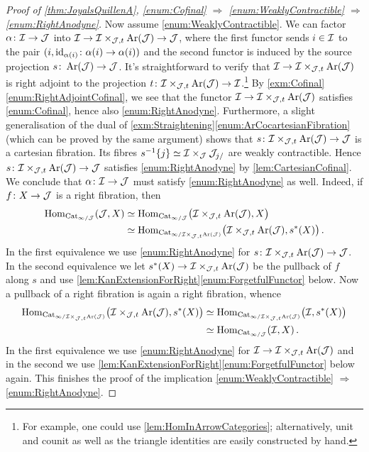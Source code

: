 \begin{proof}[Proof of \cref{thm:JoyalsQuillenA}, \cref{enum:Cofinal}  $\Rightarrow$ \cref{enum:WeaklyContractible} $\Rightarrow$ \cref{enum:RightAnodyne}]
	Now assume \cref{enum:WeaklyContractible}. We can factor $\alpha\colon \mathcal{I}\rightarrow \mathcal{J}$ into $\mathcal{I}\rightarrow \mathcal{I}\times_{\mathcal{J},t}\operatorname{Ar}(\mathcal{J})\rightarrow \mathcal{J}$, where the first functor sends $i\in \mathcal{I}$ to the pair $(i,\operatorname{id}_{\alpha(i)}\colon \alpha(i)\rightarrow \alpha(i))$ and the second functor is induced by the source projection $s\colon \operatorname{Ar}(\mathcal{J})\rightarrow \mathcal{J}$. It's straightforward to verify that $\mathcal{I}\rightarrow \mathcal{I}\times_{\mathcal{J},t}\operatorname{Ar}(\mathcal{J})$ is right adjoint to the projection $t\colon \mathcal{I}\times_{\mathcal{J},t}\operatorname{Ar}(\mathcal{J})\rightarrow \mathcal{I}$.\footnote{For example, one could use \cref{lem:HomInArrowCategories}; alternatively, unit and counit as well as the triangle identities are easily constructed by hand.} By \cref{exm:Cofinal}\cref{enum:RightAdjointCofinal}, we see that the functor $\mathcal{I}\rightarrow \mathcal{I}\times_{\mathcal{J},t}\operatorname{Ar}(\mathcal{J})$ satisfies \cref{enum:Cofinal}, hence also \cref{enum:RightAnodyne}. Furthermore, a slight generalisation of the dual of \cref{exm:Straightening}\cref{enum:ArCocartesianFibration} (which can be proved by the same argument) shows that $s\colon\mathcal{I}\times_{\mathcal{J},t}\operatorname{Ar}(\mathcal{J})\rightarrow \mathcal{J}$ is a cartesian fibration. Its fibres $s^{-1}\{j\}\simeq \mathcal{I}\times_{\mathcal{J}} \mathcal{J}_{j/}$ are weakly contractible. Hence $s\colon\mathcal{I}\times_{\mathcal{J},t}\operatorname{Ar}(\mathcal{J})\rightarrow \mathcal{J}$ satisfies \cref{enum:RightAnodyne} by \cref{lem:CartesianCofinal}. We conclude that $\alpha\colon \mathcal{I}\rightarrow \mathcal{J}$ must satisfy \cref{enum:RightAnodyne} as well. Indeed, if $f\colon X\rightarrow \mathcal{J}$ is a right fibration, then
	\begin{align*}
		\operatorname{Hom}_{\mathrm{Cat}_{\infty/\mathcal{J}}}(\mathcal{J},X)&\simeq \operatorname{Hom}_{\mathrm{Cat}_{\infty/\mathcal{J}}}\bigl(\mathcal{I}\times_{\mathcal{J},t}\operatorname{Ar}(\mathcal{J}),X\bigr)\\
		&\simeq  \operatorname{Hom}_{\mathrm{Cat}_{\infty/\mathcal{I}\times_{\mathcal{J},t}\operatorname{Ar}(\mathcal{J})}}\bigl(\mathcal{I}\times_{\mathcal{J},t}\operatorname{Ar}(\mathcal{J}),s^*(X)\bigr)\,.
	\end{align*}
	In the first equivalence we use \cref{enum:RightAnodyne} for $s\colon\mathcal{I}\times_{\mathcal{J},t}\operatorname{Ar}(\mathcal{J})\rightarrow \mathcal{J}$. In the second equivalence we let $s^*(X)\rightarrow \mathcal{I}\times_{\mathcal{J},t}\operatorname{Ar}(\mathcal{J})$ be the pullback of $f$ along $s$ and use \cref{lem:KanExtensionForRight}\cref{enum:ForgetfulFunctor} below. Now a pullback of a right fibration is again a right fibration, whence
	\begin{align*}
		\operatorname{Hom}_{\mathrm{Cat}_{\infty/\mathcal{I}\times_{\mathcal{J},t}\operatorname{Ar}(\mathcal{J})}}\bigl(\mathcal{I}\times_{\mathcal{J},t}\operatorname{Ar}(\mathcal{J}),s^*(X)\bigr)&\simeq \operatorname{Hom}_{\mathrm{Cat}_{\infty/\mathcal{I}\times_{\mathcal{J},t}\operatorname{Ar}(\mathcal{J})}}\bigl(\mathcal{I},s^*(X)\bigr)\\
		&\simeq \operatorname{Hom}_{\mathrm{Cat}_{\infty/\mathcal{J}}}(\mathcal{I},X)\,.
	\end{align*}
	In the first equivalence we use \cref{enum:RightAnodyne} for $\mathcal{I}\rightarrow \mathcal{I}\times_{\mathcal{J},t}\operatorname{Ar}(\mathcal{J})$ and in the second we use \cref{lem:KanExtensionForRight}\cref{enum:ForgetfulFunctor} below again. This finishes the proof of the implication \cref{enum:WeaklyContractible} $\Rightarrow$ \cref{enum:RightAnodyne}.
\end{proof}

